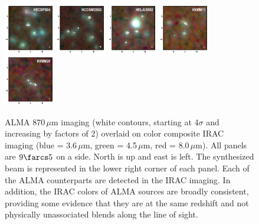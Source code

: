 \documentclass[iop]{emulateapj}
\begin{document}
\begin{figure}[!tbp] 
    \begin{centering}
\includegraphics[width=0.195\textwidth]{HECDFS04_rgb.pdf}
\includegraphics[width=0.195\textwidth]{HCOSMOS02_rgb.pdf}
\includegraphics[width=0.195\textwidth]{HELAISS02_rgb.pdf}
\includegraphics[width=0.195\textwidth]{HXMM11_rgb.pdf}
\includegraphics[width=0.195\textwidth]{HXMM20_rgb.pdf}
\end{centering}

\caption{ ALMA 870$\,\mu$m imaging (white contours, starting at 4$\sigma$ and
increasing by factors of 2) overlaid on color composite IRAC imaging (blue =
3.6$\,\mu$m, green = 4.5$\,\mu$m, red = 8.0$\,\mu$m).  All panels are $9\farcs5$
on a side.  North is up and east is left.  The synthesized beam is represented in
the lower right corner of each panel.  Each of the ALMA counterparts are
detected in the IRAC imaging.  In addition, the IRAC colors of ALMA sources are
broadly consistent, providing some evidence that they are at the same redshift
and not physically unassociated blends along the line of
sight.}\label{fig:iraccolor}

\end{figure}
\end{document}
